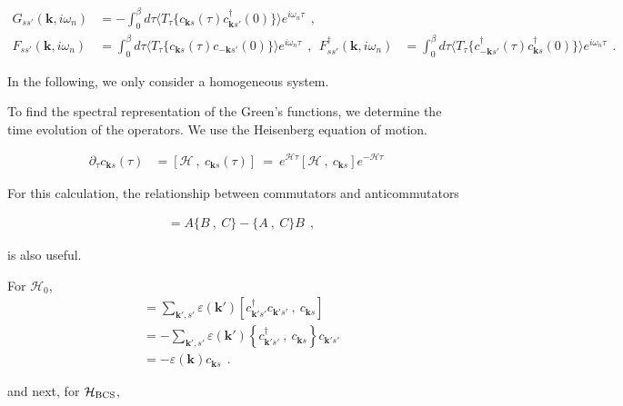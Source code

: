 \documentclass[a4j]{jsarticle}
\begin{document}
\begin{align}
	G_{ss'}(\bm{k} , i \omega_{n} )
	&=
	-
	\int_{0}^{\beta}
	d \tau
	\langle T_{\tau} \{ c_{\bm{k}s}(\tau) c_{\bm{k} s'}^{\dagger}(0) \} \rangle
	e^{i \omega_{n} \tau}
	\ \ ,
	\\[3mm]
	F_{ss'}(\bm{k} , i \omega_{n} )
	&=
	\int_{0}^{\beta}
	d \tau
	\langle T_{\tau} \{ c_{ \bm{k} s }(\tau) c_{-\bm{k} s' }(0) \} \rangle
	e^{i \omega_{n} \tau}
	\ \ , \ \
	F_{ss'}^{\dagger}(\bm{k} , i \omega_{n} )
	&=
	\int_{0}^{\beta}
	d \tau
	\langle T_{\tau} \{ c_{ - \bm{k} s' }^{\dagger}(\tau) c_{ \bm{k} s }^{\dagger}(0) \} \rangle
	e^{i \omega_{n} \tau}
	\ \ .
\end{align}

In the following, we only consider a homogeneous system.

To find the spectral representation of the Green's functions, we determine the time evolution of the operators. We use the Heisenberg equation of motion.

\begin{align}
	\partial_{\tau} c_{\bm{k}s} (\tau)
	&=
	\left[ \mathcal{H} \ , \ c_{\bm{k}s}(\tau) \right]
	\ = \
	e^{\mathcal{H} \tau} \left[ \mathcal{H} \ , \ c_{\bm{k}s} \right] e^{- \mathcal{H} \tau}
\end{align}

For this calculation, the relationship between commutators and anticommutators

\begin{align}
	[AB \ , \ C]
	&=
	A \{ B \ , \ C \} - \{ A \ , \ C \} B
	\ \ ,
\end{align}

is also useful.

For $\mathcal{H}_{0}$,
\begin{align}
	[ \mathcal{H}_{0} \ , \ c_{\bm{k}s} ]
	&=
	\sum_{\bm{k}',s'}
	\varepsilon(\bm{k}')
	\left[
		c_{\bm{k}' s'}^{\dagger}
		c_{\bm{k}' s'}
		\ , \
		c_{\bm{k}s}
		\right]
	\nonumber \\[2mm] &=
	-
	\sum_{\bm{k}',s'}
	\varepsilon(\bm{k}')
	\left\{
	c_{\bm{k}' s'}^{\dagger}
	\ , \
	c_{\bm{k}s}
	\right\}
	c_{\bm{k}' s'}
	\nonumber \\[2mm] &=
	-
	\varepsilon( \bm{k} )
	c_{\bm{k} s}
	\ \ .
\end{align}

and next, for $\mathcal{H}_{\rm BCS}$,
\end{document}
